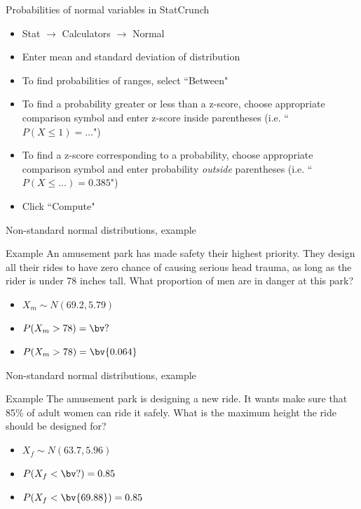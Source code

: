 \documentclass[xcolor=table, handout]{beamer}
\begin{document}
\begin{frame}{Probabilities of normal variables in StatCrunch}
\begin{block}{}
\begin{itemize}
\item Stat $\to$ Calculators $\to$ Normal
\item Enter mean and standard deviation of distribution
\item To find probabilities of ranges, select ``Between"
\item To find a probability greater or less than a z-score, choose appropriate comparison symbol and enter z-score inside parentheses (i.e. ``$P(X \le 1) =\ldots$")
\item To find a z-score corresponding to a probability, choose appropriate comparison symbol and enter probability \emph{outside} parentheses (i.e. ``$P(X \le \ldots) = 0.385$")
\item Click ``Compute"
\end{itemize}
\end{block}
\end{frame}


\begin{frame}{Non-standard normal distributions, example}
\begin{exampleblock}{Example}
An amusement park has made safety their highest priority. They design all their rides to have zero chance of causing serious head trauma, as long as the rider is under 78 inches tall. What proportion of men are in danger at this park?
\begin{itemize}
\pause\item $X_m \sim N(69.2, 5.79)$
\pause\item $P(X_m > 78) = \bv ?$
\pause\item $P(X_m > 78) = \bv{0.064}$
\end{itemize}

\end{exampleblock}
\end{frame}

\begin{frame}{Non-standard normal distributions, example}
\begin{exampleblock}{Example}
The amusement park is designing a new ride. It wants make sure that 85\% of adult women can ride it safely. What is the maximum height the ride should be designed for?
\begin{itemize} 
\pause\item $X_f \sim N(63.7, 5.96)$
\pause\item $P(X_f <  \bv ?) = 0.85$
\pause\item $P(X_f <  \bv{69.88}) = 0.85$
\end{itemize}
\end{exampleblock}
\end{frame}
\end{document}
